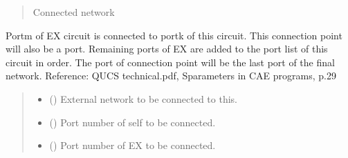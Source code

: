 \documentclass[letterpaper,10pt,english]{sphinxmanual}
\begin{document}
\begin{fulllineitems}
\begin{fulllineitems}
\begin{quote}
\begin{description}
\begin{itemize}
\end{itemize}

\sphinxAtStartPar
Connected network

\sphinxAtStartPar
{\hyperref[\detokenize{touchstone:touchstone.spfile}]{}}

\end{description}\end{quote}

\end{fulllineitems}


\begin{fulllineitems}
\label{\detokenize{touchstone:touchstone.spfile.connect_network_1_conn_retain}}
\pysigstartsignatures
{}
\pysigstopsignatures
\sphinxAtStartPar
Port\sphinxhyphen{}m of EX circuit is connected to port\sphinxhyphen{}k of this circuit. This connection point will also be a port. Remaining ports of EX are added to the port list of this circuit in order. The port of connection point will be the last port of the final network.
Reference: QUCS technical.pdf, S\sphinxhyphen{}parameters in CAE programs, p.29
\begin{quote}\begin{description}
\begin{itemize}
\item {}
\sphinxAtStartPar
{} ({\hyperref[\detokenize{touchstone:touchstone.spfile}]{}}) \textendash{} External network to be connected to this.

\item {}
\sphinxAtStartPar
{} () \textendash{} Port number of self to be connected.

\item {}
\sphinxAtStartPar
{} () \textendash{} Port number of EX to be connected.


\end{itemize}
\end{description}
\end{quote}
\end{fulllineitems}
\end{fulllineitems}
\end{document}
